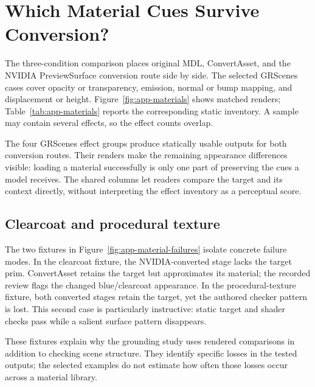 \section{Which Material Cues Survive Conversion?}
\label{app:materials}

The three-condition comparison places original MDL, ConvertAsset, and the
NVIDIA PreviewSurface conversion route side by side. The selected GRScenes
cases cover opacity or transparency, emission, normal or bump mapping, and
displacement or height. Figure~\ref{fig:app-materials} shows matched renders;
Table~\ref{tab:app-materials} reports the corresponding static inventory.
A sample may contain several effects, so the effect counts overlap.

\begin{table}[htbp]
\centering\small

\caption{Material-effect inventory. Entries count outputs passing the recorded
static checks over selected samples. Converted outputs are checked for target
presence and zero active MDL; visual appearance is examined in the paired
panels. The two fixtures are listed separately from the GRScenes samples.}
\label{tab:app-materials}
\end{table}

The four GRScenes effect groups produce statically usable outputs for both
conversion routes. Their renders make the remaining appearance differences
visible: loading a material successfully is only one part of preserving the
cues a model receives. The shared columns let readers compare the target and
its context directly, without interpreting the effect inventory as a
perceptual score.

\subsection{Clearcoat and procedural texture}
The two fixtures in Figure~\ref{fig:app-material-failures} isolate concrete
failure modes. In the clearcoat fixture, the NVIDIA-converted stage lacks the
target prim. ConvertAsset retains the target but approximates its material;
the recorded review flags the changed blue/clearcoat appearance. In the
procedural-texture fixture, both converted stages retain the target, yet the
authored checker pattern is lost. This second case is particularly instructive:
static target and shader checks pass while a salient surface pattern disappears.

These fixtures explain why the grounding study uses rendered comparisons in
addition to checking scene structure. They identify specific losses in the
tested outputs; the selected examples do not estimate how often those losses
occur across a material library.

